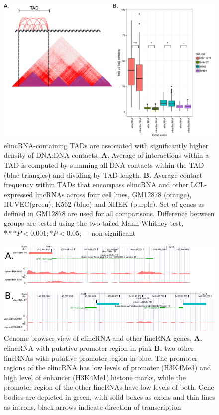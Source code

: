 \documentclass[11pt,a4paper]{report}
\begin{document}
\begin{figure}[ht]
	\includegraphics[width=1\textwidth]{Figures/5_TAD_TAD_contact.pdf}
	\caption{elincRNA-containing TADs are associated with significantly higher density of DNA:DNA contacts. \textbf{A.} Average of interactions within a TAD is computed by summing all DNA contacts within the TAD (blue triangles) and dividing by TAD length. \textbf{B.} Average contact frequency within TADs that encompass elincRNA and other LCL-expressed lincRNAs across four cell lines, GM12878 (orange), HUVEC(green), K562 (blue) and NHEK (purple). Set of genes as defined in GM12878 are used for all comparisons. Difference between groups are tested using the two tailed Mann-Whitney test, $***P<0.001; *P<0.05$; $-$ non-significant}
	\label{TAD_TAD_contacts}
\end{figure}

\begin{figure}[ht]
	\includegraphics[width=1\textwidth]{Figures/7_merged_examples.pdf}
	\caption{Genome browser view of elincRNA and other lincRNA genes. \textbf{A.} elincRNA with putative promoter region in pink \textbf{B.} two other lincRNAs with putative promoter region in blue. The promoter regions of the elincRNA has low levels of promoter (H3K4Me3) and high level of enhancer (H3K4Me1) histone marks, while the promoter region of the other lincRNAs have low levels of both. Gene bodies are depicted in green, with solid boxes as exons and thin lines as introns. black arrows indicate direction of transcription}
	\label{Genome_browser}
\end{figure}
\end{document}
